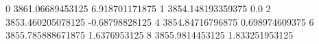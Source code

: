 0 3861.06689453125 6.918701171875
1 3854.148193359375 0.0
2 3853.460205078125 -0.68798828125
4 3854.84716796875 0.698974609375
6 3855.785888671875 1.6376953125
8 3855.9814453125 1.833251953125
